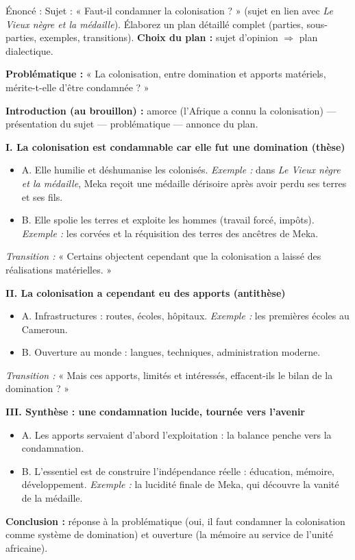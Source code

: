 \documentclass[11pt]{article}
\begin{document}
\begin{exoresolu}
Énoncé : Sujet : « Faut-il condamner la colonisation ? » (sujet en lien avec \emph{Le Vieux nègre et la médaille}). Élaborez un plan détaillé complet (parties, sous-parties, exemples, transitions).
\tcblower
\textbf{Choix du plan :} sujet d'opinion $\Rightarrow$ plan dialectique.

\textbf{Problématique :} « La colonisation, entre domination et apports matériels, mérite-t-elle d'être condamnée ? »

\textbf{Introduction (au brouillon) :} amorce (l'Afrique a connu la colonisation) — présentation du sujet — problématique — annonce du plan.

\textbf{I. La colonisation est condamnable car elle fut une domination (thèse)}
\begin{itemize}
\item A. Elle humilie et déshumanise les colonisés. \emph{Exemple :} dans \emph{Le Vieux nègre et la médaille}, Meka reçoit une médaille dérisoire après avoir perdu ses terres et ses fils.
\item B. Elle spolie les terres et exploite les hommes (travail forcé, impôts). \emph{Exemple :} les corvées et la réquisition des terres des ancêtres de Meka.
\end{itemize}
\emph{Transition :} « Certains objectent cependant que la colonisation a laissé des réalisations matérielles. »

\textbf{II. La colonisation a cependant eu des apports (antithèse)}
\begin{itemize}
\item A. Infrastructures : routes, écoles, hôpitaux. \emph{Exemple :} les premières écoles au Cameroun.
\item B. Ouverture au monde : langues, techniques, administration moderne.
\end{itemize}
\emph{Transition :} « Mais ces apports, limités et intéressés, effacent-ils le bilan de la domination ? »

\textbf{III. Synthèse : une condamnation lucide, tournée vers l'avenir}
\begin{itemize}
\item A. Les apports servaient d'abord l'exploitation : la balance penche vers la condamnation.
\item B. L'essentiel est de construire l'indépendance réelle : éducation, mémoire, développement. \emph{Exemple :} la lucidité finale de Meka, qui découvre la vanité de la médaille.
\end{itemize}

\textbf{Conclusion :} réponse à la problématique (oui, il faut condamner la colonisation comme système de domination) et ouverture (la mémoire au service de l'unité africaine).
\end{exoresolu}
\end{document}

